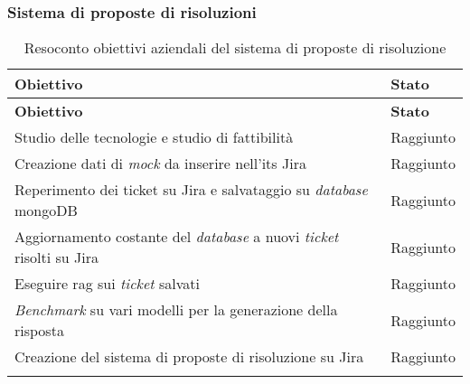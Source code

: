 \subsubsection{Sistema di proposte di risoluzioni}
\renewcommand{\arraystretch}{2}
\begin{longtable}{|p{9cm}|p{2cm}|}
    \hline
    \rowcolor{tableheader}\textbf{Obiettivo} & \textbf{Stato}\\
    \hline
    \endfirsthead

    \rowcolor{tableheader}\textbf{Obiettivo} & \textbf{Stato}\\
    \hline
    \endhead

    \hline
    \endfoot

    \hline
    \endlastfoot

    \rowcolor{tableoddrow} Studio delle tecnologie e studio di fattibilità & Raggiunto \\
    \hline
    \rowcolor{tableevenrow} Creazione dati di \textit{mock} da inserire nell'\gls{its} Jira & Raggiunto \\
    \hline
    \rowcolor{tableoddrow} Reperimento dei ticket su Jira e salvataggio su \textit{database} mongoDB & Raggiunto \\
    \hline
    \rowcolor{tableevenrow} Aggiornamento costante del \textit{database} a nuovi \textit{ticket} risolti su Jira & Raggiunto \\
    \hline
    \rowcolor{tableoddrow} Eseguire \gls{rag} sui \textit{ticket} salvati & Raggiunto \\
    \hline
    \rowcolor{tableevenrow} \textit{Benchmark} su vari modelli per la generazione della risposta & Raggiunto \\
    \hline
    \rowcolor{tableoddrow} Creazione del sistema di proposte di risoluzione su Jira & Raggiunto \\
    \hline
    \caption{Resoconto obiettivi aziendali del sistema di proposte di risoluzione}
    \label{tab:resocontoobiettiviJira}
\end{longtable}

